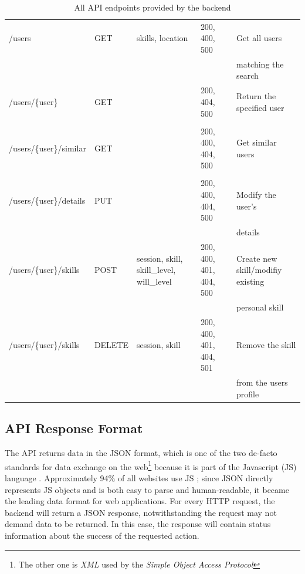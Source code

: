 \begin{table}[p]
{\begin{tabular}{l|l|l|l|l}
	/users               & GET    & skills, location                            & 200, 400, 500           & Get all users\\ & & & &  matching the search \\ \hline
  /users/\{user\}        & GET    &                                             & 200, 404, 500           & Return the specified user\\ & & & & \\  \hline
	/users/\{user\}/similar        & GET    &                                             & 200, 400, 404, 500           & Get similar users\\  & & & & \\ \hline
  /users/\{user\}/details        & PUT    &                                             & 200, 400, 404, 500           & Modify the user's\\ & & & & details \\ \hline
  /users/\{user\}/skills & POST   & session, skill, skill\_level, will\_level & 200, 400, 401, 404, 500 & Create new skill/modifiy existing\\ & & & & personal skill\\ \hline
  /users/\{user\}/skills & DELETE & session, skill                              & 200, 400, 401, 404, 501 & Remove the skill\\ & & & & from the users profile\\
  \end{tabular}
  }
\caption[API Endpoints]{All API endpoints provided by the backend}
\label{swaggertable}
\end{table}
\subsection{API Response Format}
The API returns data in the JSON format, which is one of the two de-facto standards for data exchange on the web\footnote{The other one is \textit{XML} used by the \textit{Simple Object Access Protocol}} because it is part of the Javascript (JS) language \cite[p. 37]{json}. Approximately 94\% of all websites use JS \cite{jsmarket}; since JSON directly represents JS objects and is both easy to parse and human-readable, it became the leading data format for web applications.
For every HTTP request, the backend will return a JSON response, notwithstanding the request may not demand data to be returned. In this case, the response will contain status information about the success of the requested action.

